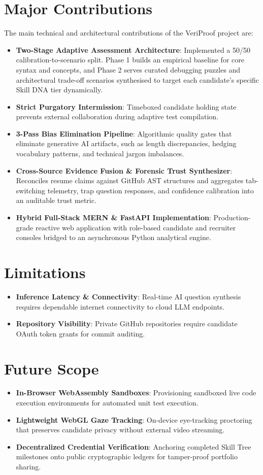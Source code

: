 \section{Major Contributions}
The main technical and architectural contributions of the VeriProof project are:
\begin{itemize}
    \item \textbf{Two-Stage Adaptive Assessment Architecture}: Implemented a 50/50 calibration-to-scenario split. Phase 1 builds an empirical baseline for core syntax and concepts, and Phase 2 serves curated debugging puzzles and architectural trade-off scenarios synthesised to target each candidate's specific Skill DNA tier dynamically.
    \item \textbf{Strict Purgatory Intermission}: Timeboxed candidate holding state prevents external collaboration during adaptive test compilation.
    \item \textbf{3-Pass Bias Elimination Pipeline}: Algorithmic quality gates that eliminate generative AI artifacts, such as length discrepancies, hedging vocabulary patterns, and technical jargon imbalances.
    \item \textbf{Cross-Source Evidence Fusion \& Forensic Trust Synthesizer}: Reconciles resume claims against GitHub AST structures and aggregates tab-switching telemetry, trap question responses, and confidence calibration into an auditable trust metric.
    \item \textbf{Hybrid Full-Stack MERN \& FastAPI Implementation}: Production-grade reactive web application with role-based candidate and recruiter consoles bridged to an asynchronous Python analytical engine.
\end{itemize}

\section{Limitations}
\begin{itemize}
    \item \textbf{Inference Latency \& Connectivity}: Real-time AI question synthesis requires dependable internet connectivity to cloud LLM endpoints.
    \item \textbf{Repository Visibility}: Private GitHub repositories require candidate OAuth token grants for commit auditing.
\end{itemize}

\section{Future Scope}
\begin{itemize}
    \item \textbf{In-Browser WebAssembly Sandboxes}: Provisioning sandboxed live code execution environments for automated unit test execution.
    \item \textbf{Lightweight WebGL Gaze Tracking}: On-device eye-tracking proctoring that preserves candidate privacy without external video streaming.
    \item \textbf{Decentralized Credential Verification}: Anchoring completed Skill Tree milestones onto public cryptographic ledgers for tamper-proof portfolio sharing.
\end{itemize}